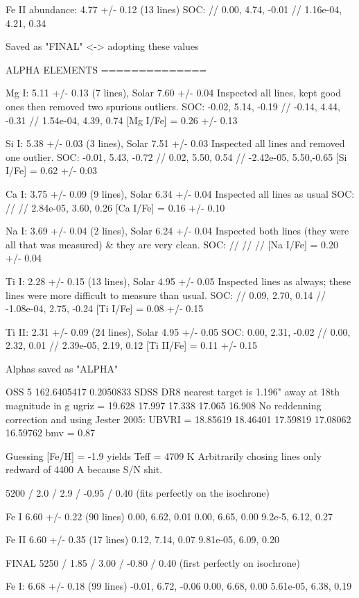 \documentclass{emulateapj}
\begin{document}
Fe II abundance: 4.77 +/- 0.12 (13 lines)
SOC: // 0.00, 4.74, -0.01 // 1.16e-04, 4.21, 0.34

Saved as "FINAL" <-> adopting these values

ALPHA ELEMENTS
==============

Mg I: 5.11 +/- 0.13 (7 lines), Solar 7.60 +/- 0.04
Inspected all lines, kept good ones then removed two spurious outliers.
SOC: -0.02, 5.14, -0.19 // -0.14, 4.44, -0.31 // 1.54e-04, 4.39, 0.74
[Mg I/Fe] = 0.26 +/- 0.13

Si I: 5.38 +/- 0.03 (3 lines), Solar 7.51 +/- 0.03
Inspected all lines and removed one outlier.
SOC: -0.01, 5.43, -0.72 // 0.02, 5.50, 0.54 // -2.42e-05, 5.50,-0.65
[Si I/Fe] = 0.62 +/- 0.03

Ca I: 3.75 +/- 0.09 (9 lines), Solar 6.34 +/- 0.04
Inspected all lines as usual
SOC: // // 2.84e-05, 3.60, 0.26
[Ca I/Fe] = 0.16 +/- 0.10

Na I: 3.69 +/- 0.04 (2 lines), Solar 6.24 +/- 0.04
Inspected both lines (they were all that was measured) & they are very clean.
SOC: // // //
[Na I/Fe] = 0.20 +/- 0.04

Ti I: 2.28 +/- 0.15 (13 lines), Solar 4.95 +/- 0.05
Inspected lines as always; these lines were more difficult to measure than usual.
SOC: // 0.09, 2.70, 0.14 // -1.08e-04, 2.75, -0.24
[Ti I/Fe] = 0.08 +/- 0.15

Ti II: 2.31 +/- 0.09 (24 lines), Solar 4.95 +/- 0.05
SOC: 0.00, 2.31, -0.02 // 0.00, 2.32, 0.01 // 2.39e-05, 2.19, 0.12
[Ti II/Fe] = 0.11 +/- 0.15

Alphas saved as "ALPHA"


OSS 5
162.6405417 0.2050833
SDSS DR8 nearest target is 1.196" away at 18th magnitude in g
ugriz = 19.628 17.997 17.338 17.065 16.908
No reddenning correction and using Jester 2005:
UBVRI = 18.85619 18.46401 17.59819 17.08062 16.59762
bmv = 0.87

Guessing [Fe/H] = -1.9 yields Teff = 4709 K
Arbitrarily chosing lines only redward of 4400 A because S/N shit.

5200 / 2.0 / 2.9 / -0.95 / 0.40 (fits perfectly on the isochrone)

Fe I 6.60 +/- 0.22 (90 lines)
0.00, 6.62, 0.01
0.00, 6.65, 0.00
9.2e-5, 6.12, 0.27

Fe II 6.60 +/- 0.35 (17 lines)
0.12, 7.14, 0.07
9.81e-05, 6.09, 0.20

FINAL
5250 / 1.85 / 3.00 / -0.80 / 0.40 (first perfectly on isochrone)

Fe I: 6.68 +/- 0.18 (99 lines)
-0.01, 6.72, -0.06
0.00, 6.68, 0.00
5.61e-05, 6.38, 0.19
\end{document}

